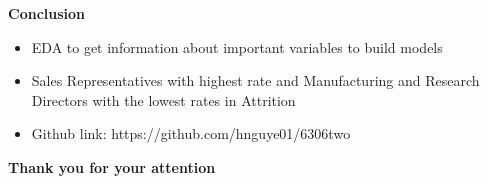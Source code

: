 \documentclass[notes,11pt]{beamer}
\begin{document}





\begin{frame}
\begin{center}
\textbf{\color{blue}\Large{Conclusion}}
\end{center}
\begin{itemize}
\item<1-> EDA to get information about important variables to build models  
\item<2-> Sales Representatives with highest rate and Manufacturing and Research Directors with the lowest rates in Attrition
\item<3-> Github link: https://github.com/hnguye01/6306two
\end{itemize}
\end{frame}



\begin{frame}

\begin{center}

\textbf{\color{red}Thank you for your attention}
\bigskip



\end{center}

\end{frame}
\end{document}
